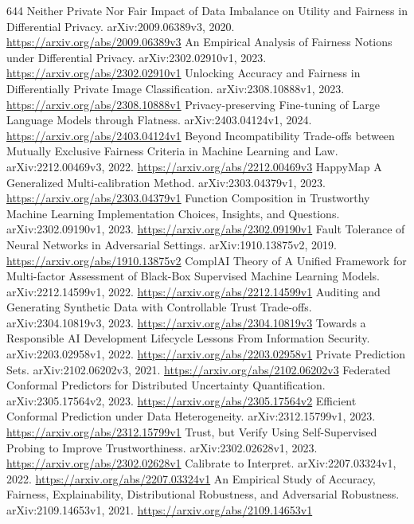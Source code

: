 \documentclass[11pt]{article}
\begin{document}
\begin{thebibliography}{644}
 Neither Private Nor Fair Impact of Data Imbalance on Utility and Fairness in Differential Privacy. arXiv:2009.06389v3, 2020. \url{https://arxiv.org/abs/2009.06389v3}
 An Empirical Analysis of Fairness Notions under Differential Privacy. arXiv:2302.02910v1, 2023. \url{https://arxiv.org/abs/2302.02910v1}
 Unlocking Accuracy and Fairness in Differentially Private Image Classification. arXiv:2308.10888v1, 2023. \url{https://arxiv.org/abs/2308.10888v1}
 Privacy-preserving Fine-tuning of Large Language Models through Flatness. arXiv:2403.04124v1, 2024. \url{https://arxiv.org/abs/2403.04124v1}
 Beyond Incompatibility Trade-offs between Mutually Exclusive Fairness Criteria in Machine Learning and Law. arXiv:2212.00469v3, 2022. \url{https://arxiv.org/abs/2212.00469v3}
 HappyMap A Generalized Multi-calibration Method. arXiv:2303.04379v1, 2023. \url{https://arxiv.org/abs/2303.04379v1}
 Function Composition in Trustworthy Machine Learning Implementation Choices, Insights, and Questions. arXiv:2302.09190v1, 2023. \url{https://arxiv.org/abs/2302.09190v1}
 Fault Tolerance of Neural Networks in Adversarial Settings. arXiv:1910.13875v2, 2019. \url{https://arxiv.org/abs/1910.13875v2}
 ComplAI Theory of A Unified Framework for Multi-factor Assessment of Black-Box Supervised Machine Learning Models. arXiv:2212.14599v1, 2022. \url{https://arxiv.org/abs/2212.14599v1}
 Auditing and Generating Synthetic Data with Controllable Trust Trade-offs. arXiv:2304.10819v3, 2023. \url{https://arxiv.org/abs/2304.10819v3}
 Towards a Responsible AI Development Lifecycle Lessons From Information Security. arXiv:2203.02958v1, 2022. \url{https://arxiv.org/abs/2203.02958v1}
 Private Prediction Sets. arXiv:2102.06202v3, 2021. \url{https://arxiv.org/abs/2102.06202v3}
 Federated Conformal Predictors for Distributed Uncertainty Quantification. arXiv:2305.17564v2, 2023. \url{https://arxiv.org/abs/2305.17564v2}
 Efficient Conformal Prediction under Data Heterogeneity. arXiv:2312.15799v1, 2023. \url{https://arxiv.org/abs/2312.15799v1}
 Trust, but Verify Using Self-Supervised Probing to Improve Trustworthiness. arXiv:2302.02628v1, 2023. \url{https://arxiv.org/abs/2302.02628v1}
 Calibrate to Interpret. arXiv:2207.03324v1, 2022. \url{https://arxiv.org/abs/2207.03324v1}
 An Empirical Study of Accuracy, Fairness, Explainability, Distributional Robustness, and Adversarial Robustness. arXiv:2109.14653v1, 2021. \url{https://arxiv.org/abs/2109.14653v1}

\end{thebibliography}
\end{document}
